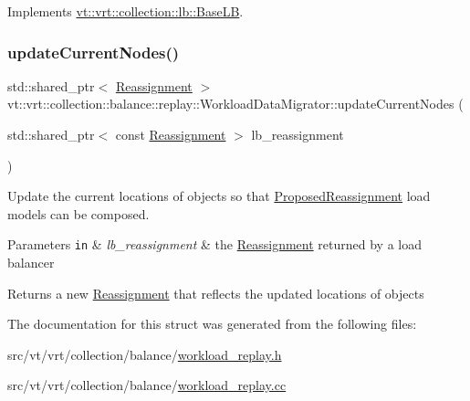 Implements \hyperlink{structvt_1_1vrt_1_1collection_1_1lb_1_1_base_l_b_aa957038bb132ac29fb61535487f0604f}{vt\+::vrt\+::collection\+::lb\+::\+Base\+LB}.

\mbox{\label{structvt_1_1vrt_1_1collection_1_1balance_1_1replay_1_1_workload_data_migrator_a1bfb98f8073924f31127b5b98855951b}} 
\subsubsection{\texorpdfstring{update\+Current\+Nodes()}{updateCurrentNodes()}}
{\footnotesize\ttfamily std\+::shared\+\_\+ptr$<$ \hyperlink{structvt_1_1vrt_1_1collection_1_1balance_1_1_reassignment}{Reassignment} $>$ vt\+::vrt\+::collection\+::balance\+::replay\+::\+Workload\+Data\+Migrator\+::update\+Current\+Nodes (\begin{DoxyParamCaption}\item[{std\+::shared\+\_\+ptr$<$ const \hyperlink{structvt_1_1vrt_1_1collection_1_1balance_1_1_reassignment}{Reassignment} $>$}]{lb\+\_\+reassignment }\end{DoxyParamCaption})\hspace{0.3cm}{\ttfamily [static]}}



Update the current locations of objects so that \hyperlink{structvt_1_1vrt_1_1collection_1_1balance_1_1_proposed_reassignment}{Proposed\+Reassignment} load models can be composed. 


\begin{DoxyParams}[1]{Parameters}
\mbox{\tt in}  & {\em lb\+\_\+reassignment} & the \hyperlink{structvt_1_1vrt_1_1collection_1_1balance_1_1_reassignment}{Reassignment} returned by a load balancer\\
\hline
\end{DoxyParams}
\begin{DoxyReturn}{Returns}
a new \hyperlink{structvt_1_1vrt_1_1collection_1_1balance_1_1_reassignment}{Reassignment} that reflects the updated locations of objects 
\end{DoxyReturn}


The documentation for this struct was generated from the following files\+:\begin{DoxyCompactItemize}
\item 
src/vt/vrt/collection/balance/\hyperlink{workload__replay_8h}{workload\+\_\+replay.\+h}\item 
src/vt/vrt/collection/balance/\hyperlink{workload__replay_8cc}{workload\+\_\+replay.\+cc}\end{DoxyCompactItemize}
